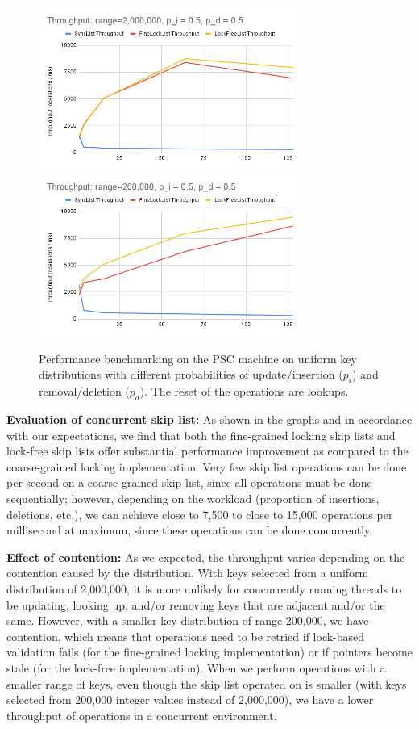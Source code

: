 \documentclass[11pt]{article}
\begin{document}
\begin{figure}[h!]
\includegraphics[width=3.4in]{Throughput range=2,000,000, p_i = 0.5, p_d = 0.5.png}
\includegraphics[width=3.4in]{Throughput range=200,000, p_i = 0.5, p_d = 0.5.png}
\caption{Performance benchmarking on the PSC machine on uniform key distributions with different probabilities of update/insertion ($p_i$) and removal/deletion ($p_d$). The reset of the operations are lookups. }
\end{figure}
\textbf{Evaluation of concurrent skip list:} As shown in the graphs and in accordance with our expectations, we find that both the fine-grained locking skip lists and lock-free skip lists offer substantial performance improvement as compared to the coarse-grained locking implementation. Very few skip list operations can be done per second on a coarse-grained skip list, since all operations must be done sequentially; however, depending on the workload (proportion of insertions, deletions, etc.), we can achieve close to 7,500 to close to 15,000 operations per millisecond at maximum, since these operations can be done concurrently.

\textbf{Effect of contention:} As we expected, the throughput varies depending on the contention caused by the distribution. With keys selected from a uniform distribution of 2,000,000, it is more unlikely for concurrently running threads to be updating, looking up, and/or removing keys that are adjacent and/or the same. However, with a smaller key distribution of range 200,000, we have contention, which means that operations need to be retried if lock-based validation fails (for the fine-grained locking implementation) or if pointers become stale (for the lock-free implementation). When we perform operations with a smaller range of keys, even though the skip list operated on is smaller (with keys selected from 200,000 integer values instead of 2,000,000), we have a lower throughput of operations in a concurrent environment.
\end{document}
